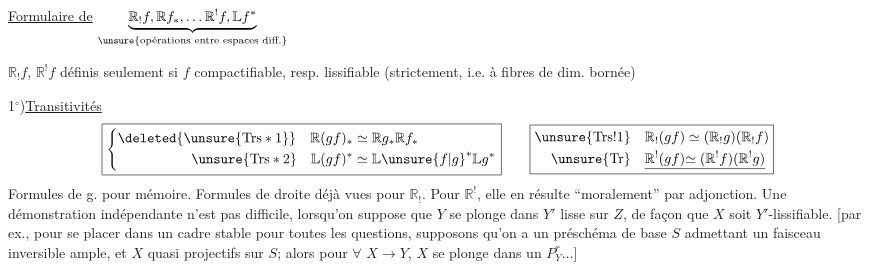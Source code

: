 
\uline{Formulaire de}
$\underbrace{\mathbb{R}_!f,\mathbb{R}f_*,\ldots \mathbb{R}^!f,\mathbb{L}f^*}_{\text{\unsure{opérations entre espaces diff.}}}$

$\mathbb{R}_!f$, $\mathbb{R}^!f$ définis seulement si $f$ compactifiable,
resp. lissifiable (strictement, i.e. 
à fibres de dim. bornée)

1$^\circ$)\quad \uline{Transitivités}
\[
\begin{array}{c@{\qquad}c}
\boxed{\left\{\begin{aligned}
\deleted{\unsure{\mathrm{Trs}*1}}\quad \mathbb{R}(gf)_*&\simeq \mathbb{R}g_*\mathbb{R}f_*\\
\unsure{\mathrm{Trs}*2}\quad \mathbb{L}(gf)^*&\simeq \mathbb{L}\unsure{f|g}^*\mathbb{L}g^*
\end{aligned}\right.}
&
\boxed{\begin{aligned}
\unsure{\mathrm{Trs}!1}\quad \mathbb{R}_!(gf)&\simeq(\mathbb{R}_!g)(\mathbb{R}_!f)\\
\unsure{\mathrm{Tr}}\quad \underline{\mathbb{R}^!(gf)}&\underline{\simeq(\mathbb{R}^!f)(\mathbb{R}^!g)}
\end{aligned}}
\end{array}
\]
Formules de g. pour mémoire. Formules de
droite déjà vues pour $\mathbb{R}_!$. Pour $\mathbb{R}^!$, elle
en résulte ``moralement'' par adjonction. Une
démonstration indépendante n'est pas difficile,
lorsqu'on suppose que $Y$ se plonge dans
$Y'$ lisse sur $Z$, de façon que
$X$ soit $Y'$-lissifiable.
[par ex.,
pour se placer dans un cadre
stable pour toutes les questions, supposons
qu'on a un préschéma de base
$S$ admettant un faisceau inversible ample,
et 
$X$ quasi projectifs sur $S$; alors
pour $\forall$ $X\longrightarrow Y$, $X$ se plonge dans un
$P_Y^r\ldots$]
